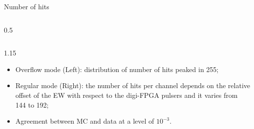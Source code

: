 \documentclass{beamer}
\begin{document}
\begin{frame}{Number of hits}
\begin{columns}
\begin{column}{0.5\framewidth}
\begin{figure}[h!]
              \label{fig:un} 
              \end{figure} 
        \end{column}
    \end{columns}
     \vspace{-3mm}
     \begin{columns}
        \begin{column}{1.15\framewidth}
         \begin{itemize}
            \item Overflow mode (Left): distribution of number of hits peaked in 255; 
            \item Regular mode (Right): the number of hits per channel depends on the relative offset of the EW  with respect to the digi-FPGA pulsers and it varies from 
    144 to 192;
                \item Agreement between MC and data at a level of $10^{-3}$.
    
        \end{itemize}  
        \end{column}
        \end{columns}
    \end{frame}
\end{document}
